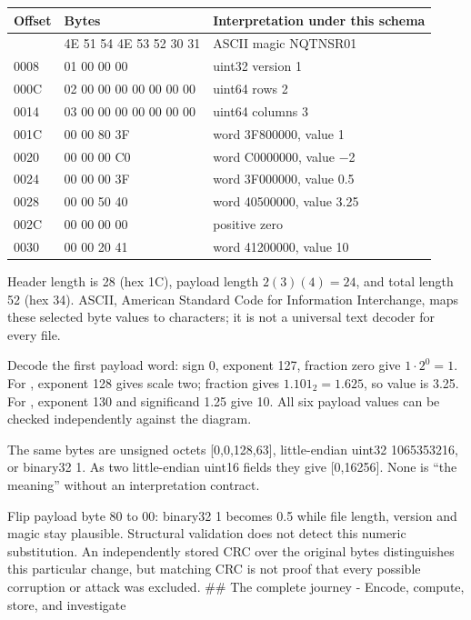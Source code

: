 {\def\LTcaptype{none} %
\begin{longtable}[]{@{}lll@{}}
\toprule\noalign{}
Offset & Bytes & Interpretation under this schema \\
\midrule\noalign{}
\endhead
\bottomrule\noalign{}
\endlastfoot
0000 & 4E 51 54 4E 53 52 30 31 & ASCII magic NQTNSR01 \\
0008 & 01 00 00 00 & uint32 version 1 \\
000C & 02 00 00 00 00 00 00 00 & uint64 rows 2 \\
0014 & 03 00 00 00 00 00 00 00 & uint64 columns 3 \\
001C & 00 00 80 3F & word 3F800000, value 1 \\
0020 & 00 00 00 C0 & word C0000000, value −2 \\
0024 & 00 00 00 3F & word 3F000000, value 0.5 \\
0028 & 00 00 50 40 & word 40500000, value 3.25 \\
002C & 00 00 00 00 & positive zero \\
0030 & 00 00 20 41 & word 41200000, value 10 \\
\end{longtable}
}

Header length is 28 (hex 1C), payload length \(2(3)(4)=24\), and total length 52 (hex 34). ASCII, American Standard Code for Information Interchange, maps these selected byte values to characters; it is not a universal text decoder for every file.

Decode the first payload word: sign 0, exponent 127, fraction zero give \(1\cdot2^0=1\). For , exponent 128 gives scale two; fraction gives \(1.101_2=1.625\), so value is 3.25. For , exponent 130 and significand 1.25 give 10. All six payload values can be checked independently against the diagram.

The same  bytes are unsigned octets {[}0,0,128,63{]}, little-endian uint32 1065353216, or binary32 1. As two little-endian uint16 fields they give {[}0,16256{]}. None is ``the meaning'' without an interpretation contract.

Flip payload byte 80 to 00: binary32 1 becomes 0.5 while file length, version and magic stay plausible. Structural validation does not detect this numeric substitution. An independently stored CRC over the original bytes distinguishes this particular change, but matching CRC is not proof that every possible corruption or attack was excluded. \#\# The complete journey - Encode, compute, store, and investigate

